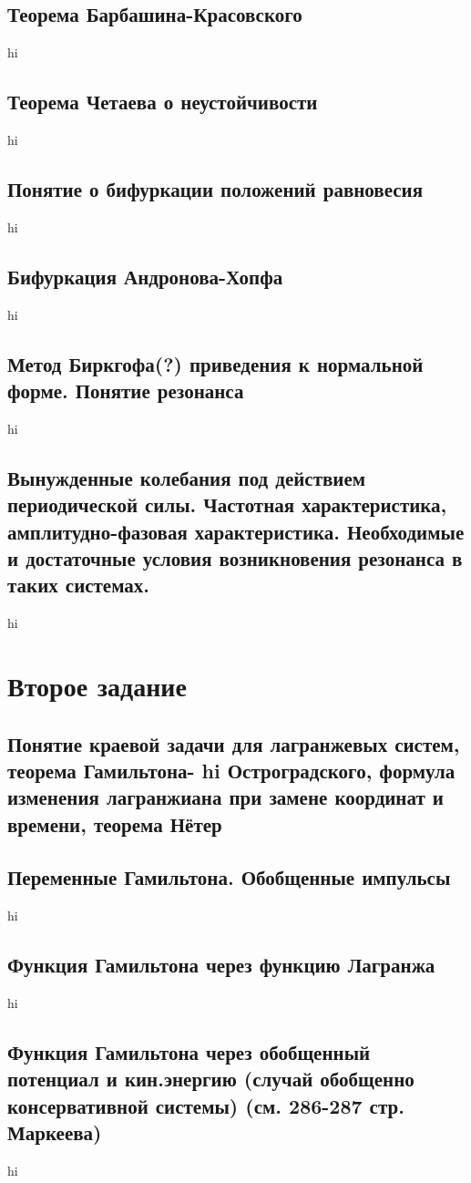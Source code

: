 \documentclass[a4paper,12pt]{article}
\begin{document}
\subsection{Теорема Барбашина-Красовского}
hi
\subsection{Теорема Четаева о неустойчивости}
hi
\subsection{Понятие о бифуркации положений равновесия}
hi
\subsection{Бифуркация Андронова-Хопфа}
hi
\subsection{Метод Биркгофа(?) приведения к нормальной форме. Понятие резонанса}
hi
\subsection{Вынужденные колебания под действием периодической силы. Частотная
характеристика, амплитудно-фазовая характеристика. Необходимые и достаточные
условия возникновения резонанса в таких системах.}
hi
\section*{Второе задание}
\setcounter{subsection}{0}
\subsection{Понятие краевой задачи для лагранжевых систем, теорема Гамильтона-
hi
Остроградского, формула изменения лагранжиана при замене координат и
времени, теорема Нётер}
\subsection{Переменные Гамильтона. Обобщенные импульсы}
hi
\subsection{Функция Гамильтона через функцию Лагранжа}
hi
\subsection{Функция Гамильтона через обобщенный потенциал и кин.энергию (случай
обобщенно консервативной системы) (см. 286-287 стр. Маркеева)}
hi
\end{document}
